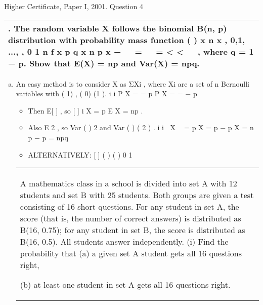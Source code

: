 \documentclass[a4paper,12pt]{article}
\begin{document}
Higher Certificate, Paper I, 2001. Question 4

\begin{table}[ht!]
 \centering
 \begin{tabular}{|p{15cm}|}
 \hline
\noindent 
4. The random variable X follows the binomial B(n, p) distribution with probability
mass function
( ) x n x , 0,1, ..., , 0 1 n
f x p q x n p
x
−  
=   = < <
 
,
where q = 1 − p. Show that E(X) = np and Var(X) = npq.
\\ \hline
  \end{tabular}
\end{table}



\begin{enumerate}[(a)]
\item An easy method is to consider X as ΣXi , where Xi are a set of n Bernoulli variables
with ( 1) , ( 0) (1 ). i i P X = = p P X = = − p
\begin{itemize}
\item Then E[ ] , so [ ] i X = p E X = np .
\item Also E 2 , so Var ( ) 2 and Var ( ) ( 2 ) . i i X  = p X = p − p X = n p − p = npq
\item ALTERNATIVELY: [ ] ( ) ( ) 0 1

\end{itemize}

\begin{table}[ht!]
 \centering
 \begin{tabular}{|p{15cm}|}
 \hline
\noindent 
A mathematics class in a school is divided into set A with 12 students and set B
with 25 students. Both groups are given a test consisting of 16 short questions.
For any student in set A, the score (that is, the number of correct answers) is
distributed as B(16, 0.75); for any student in set B, the score is distributed as
B(16, 0.5). All students answer independently.
(i) Find the probability that
(a) a given set A student gets all 16 questions right,

(b) at least one student in set A gets all 16 questions right.


\end{tabular}
\end{table}
\end{enumerate}
\end{document}

